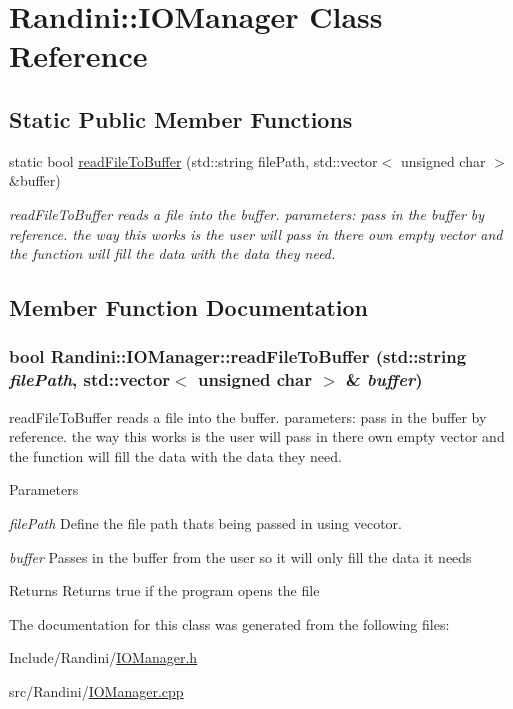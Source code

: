 \hypertarget{classRandini_1_1IOManager}{
\section{Randini::IOManager Class Reference}
\label{classRandini_1_1IOManager}
}
\subsection*{Static Public Member Functions}
\begin{DoxyCompactItemize}
\item 
static bool \hyperlink{classRandini_1_1IOManager_a2fee0167fb6b1731495af896f6441e3e}{readFileToBuffer} (std::string filePath, std::vector$<$ unsigned char $>$ \&buffer)
\begin{DoxyCompactList}\small\item\em readFileToBuffer reads a file into the buffer. parameters: pass in the buffer by reference. the way this works is the user will pass in there own empty vector and the function will fill the data with the data they need. \item\end{DoxyCompactList}\end{DoxyCompactItemize}


\subsection{Member Function Documentation}
\hypertarget{classRandini_1_1IOManager_a2fee0167fb6b1731495af896f6441e3e}{
\subsubsection[{readFileToBuffer}]{\setlength{\rightskip}{0pt plus 5cm}bool Randini::IOManager::readFileToBuffer (std::string {\em filePath}, \/  std::vector$<$ unsigned char $>$ \& {\em buffer})}}
\label{classRandini_1_1IOManager_a2fee0167fb6b1731495af896f6441e3e}


readFileToBuffer reads a file into the buffer. parameters: pass in the buffer by reference. the way this works is the user will pass in there own empty vector and the function will fill the data with the data they need. 
\begin{DoxyParams}{Parameters}
\item[{\em filePath}]Define the file path thats being passed in using vecotor. \item[{\em buffer}]Passes in the buffer from the user so it will only fill the data it needs\end{DoxyParams}
\begin{DoxyReturn}{Returns}
Returns true if the program opens the file 
\end{DoxyReturn}


The documentation for this class was generated from the following files:\begin{DoxyCompactItemize}
\item 
Include/Randini/\hyperlink{IOManager_8h}{IOManager.h}\item 
src/Randini/\hyperlink{IOManager_8cpp}{IOManager.cpp}\end{DoxyCompactItemize}
